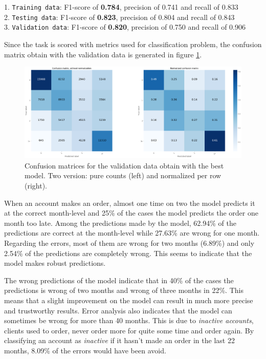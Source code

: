 \noindent\hspace*{0.8cm}  1. \texttt{Training data}:   F1-score of \textbf{0.784}, precision of 0.741 and recall of 0.833 \\
\hspace*{0.8cm}           2. \texttt{Testing data}:    F1-score of \textbf{0.823}, precision of 0.804 and recall of 0.843 \\
\hspace*{0.8cm}           3. \texttt{Validation data}: F1-score of \textbf{0.820}, precision of 0.750 and recall of 0.906

Since the task is scored with metrics used for classification problem, the confusion matrix obtain with the validation data is generated in figure \ref{fig:cf-matrix-validation}.

\begin{figure}[htbp]
    \centering
    \includegraphics[width=15cm]{images/cf-matrix-validation_complete.png}
    \caption[Confusion matrix for validation data]{Confusion matrices for the validation data obtain with the best model. Two version: pure counts (left) and normalized per row (right).}
    \label{fig:cf-matrix-validation}
\end{figure}

When an account makes an order, almost one time on two the model predicts it at the correct month-level and 25\% of the cases the model predicts the order one month too late. Among the predictions made by the model, 62.94\% of the predictions are correct at the month-level while 27.63\% are wrong for one month. Regarding the errors, most of them are wrong for two months (6.89\%) and only 2.54\% of the predictions are completely wrong. This seems to indicate that the model makes robust predictions.

The wrong predictions of the model indicate that in 40\% of the cases the predictions is wrong of two months and wrong of three months in 22\%. This means that a slight improvement on the model can result in much more precise and trustworthy results. Error analysis also indicates that the model can sometimes be wrong for more than 40 months. This is due to \textit{inactive accounts}, clients used to order, never order more for quite some time and order again. By classifying an account as \textit{inactive} if it hasn't made an order in the last 22 months, 8.09\% of the errors would have been avoid.

